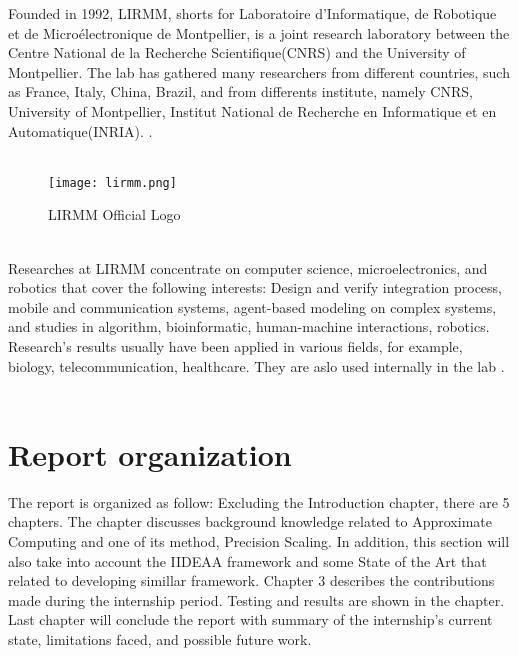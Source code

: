 Founded in 1992, LIRMM, shorts for Laboratoire d'Informatique, de Robotique et de Microélectronique de Montpellier, is a joint research laboratory between the Centre National de la Recherche Scientifique(CNRS) and the University of Montpellier. The lab has gathered many researchers from different countries, such as France, Italy, China, Brazil, and from differents institute, namely CNRS, University of Montpellier, Institut National de Recherche en Informatique et en Automatique(INRIA). \cite{LIRMM}.~\\
~\\
\begin{figure}[h]
\texttt{[image: lirmm.png]}
\centering
\caption{LIRMM Official Logo}
\end{figure}
~\\
Researches at LIRMM concentrate on computer science, microelectronics, and robotics that cover the following interests: Design and verify integration process, mobile and communication systems, agent-based modeling on complex systems, and studies in algorithm, bioinformatic, human-machine interactions, robotics. Research's results usually have been applied in various fields, for example, biology, telecommunication, healthcare. They are aslo used internally in the lab \cite{LIRMM}. ~\\ 
\vspace*{3cm}


\section{Report organization}

The report is organized as follow: Excluding the Introduction chapter, there are 5 chapters. The  chapter discusses background knowledge related to Approximate Computing and one of its method, Precision Scaling. In addition, this section will also take into account the IIDEAA framework and some State of the Art that related to developing simillar framework. Chapter 3 describes the contributions made during the internship period. Testing and results are shown in the  chapter. Last chapter will conclude the report with summary of the internship's current state, limitations faced, and possible future work. 